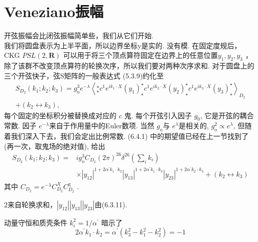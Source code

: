 \section{Veneziano振幅}%
开弦振幅会比闭弦振幅简单些，我们从它们开始.\\
我们将圆盘表示为上半平面，所以边界坐标y是实的. 没有模. 在固定度规后，CKG $P S L(2, \mathbf{R})$ 可以用于将三个顶点算符固定在边界上的任意位置$y_{1}, y_{2}, y_{3}$ ，除了该群不改变顶点算符的轮换次序，所以我们要对两种次序求和. 对于圆盘上的三个开弦快子，弦S矩阵的一般表达式 (5.3.9)约化至
\begin{equation}
	\begin{array}{r}
		S_{D_{2}}\left(k_{1} ; k_{2} ; k_{3}\right)=g_{\mathrm{o}}^{3} e^{-\lambda}\left\langle {}_\star^\star c^1 e^{i k_{1} \cdot X}\left(y_{1}\right)_{\star}^{\star}  c^{1} e^{i k_{2} \cdot X}\left(y_{2}\right)_{\star}^{\star}  c^{1} e^{i k_{3} \cdot X}\left(y_{3}\right)_{\star}^{\star}\right\rangle_{D_{2}} \\
		+\left(k_{2} \leftrightarrow k_{3}\right),
	\end{array}
\end{equation}
每个固定的坐标积分被替换成对应的 $c$ 鬼. 每个开弦引入因子 $g_{0}$, 它是开弦的耦合常数. 因子 $e^{-\lambda}$来自于作用量中的Euler数项. 当然 $g_{\mathrm{o}}$与 $e^{\lambda}$是相关的, $g_{\mathrm{o}}^{2} \propto e^{\lambda}$, 但随着我们深入下去，我们会定出比例常数. (6.4.1) 中的期望值已经在上一节找到了 (再一次，取鬼场的绝对值), 给出
\begin{equation}
\begin{aligned}
S_{D_{2}}\left(k_{1} ; k_{2} ; k_{3}\right)=& i g_{\mathrm{o}}^{3} C_{D_{2}}(2 \pi)^{26} \delta^{26}\left(\sum_{i} k_{i}\right) \\
& \times\left|y_{12}\right|^{1+2 \alpha^{\prime} k_{1} \cdot k_{2}}\left|y_{13}\right|^{1+2 \alpha^{\prime} k_{1} \cdot k_{3}}\left|y_{23}\right|^{1+2 \alpha^{\prime} k_{2} \cdot k_{3}}+\left(k_{2} \leftrightarrow k_{3}\right)
\end{aligned}
\end{equation}
其中 $C_{D_{2}}=e^{-\lambda} C_{D_{2}}^{X} C_{D_{2}}^{\mathrm{g}} $ .\\
\begin{remark}
2来自轮换求和，$\left|y_{12}\right|\left|y_{13}\right|\left|y_{23}\right|$由(6.3.11).
\end{remark}
动量守恒和质壳条件 $k_{i}^{2}=1 / \alpha^{\prime}$ 暗示了
\begin{equation}
	2 \alpha^{\prime} k_{1} \cdot k_{2}=\alpha^{\prime}\left(k_{3}^{2}-k_{1}^{2}-k_{2}^{2}\right)=-1
\end{equation}
